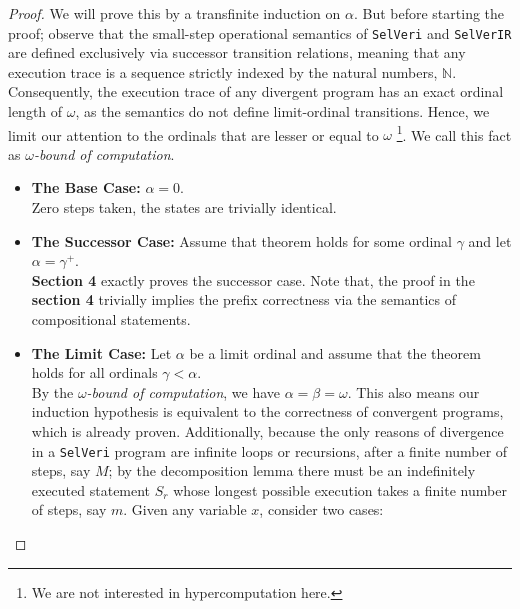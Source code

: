 \documentclass{article}
\begin{document}
\begin{proof} We will prove this by a transfinite induction on $\alpha$. But before starting the proof; observe that the small-step operational semantics of \texttt{SelVeri} and \texttt{SelVerIR} are defined exclusively via successor transition relations, meaning that any execution trace is a sequence strictly indexed by the natural numbers, $\mathbb{N}$. Consequently, the execution trace of any divergent program has an exact ordinal length of $\omega$, as the semantics do not define limit-ordinal transitions. Hence, we limit our attention to the ordinals that are lesser or equal to $\omega$ \footnote{We are not interested in hypercomputation here.}. We call this fact as \textit{$\omega$-bound of computation}.

    \begin{itemize}
        \item \textbf{The Base Case:} $\alpha = 0$. \\
        Zero steps taken, the states are trivially identical.

        \item \textbf{The Successor Case:} Assume that theorem holds for some ordinal $\gamma$ and let $\alpha = \gamma^+$. \\
        \textbf{Section 4} exactly proves the successor case. Note that, the proof in the \textbf{section 4} trivially implies the prefix correctness via the semantics of compositional statements.

        \item \textbf{The Limit Case:} Let $\alpha$ be a limit ordinal and assume that the theorem holds for all ordinals $\gamma < \alpha$. \\ By the \textit{$\omega$-bound of computation}, we have $\alpha = \beta = \omega$. This also means our induction hypothesis is equivalent to the correctness of convergent programs, which is already proven. Additionally, because the only reasons of divergence in a \texttt{SelVeri} program are infinite loops or recursions, after a finite number of steps, say $M$; by the decomposition lemma there must be an indefinitely executed statement $S_r$  whose longest possible execution takes a finite number of steps, say $m$. Given any variable $x$, consider two cases:


\end{itemize}
\end{proof}
\end{document}

